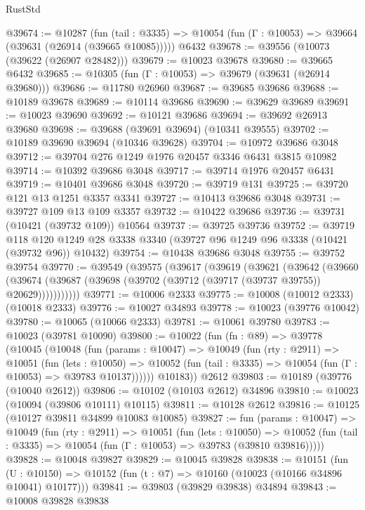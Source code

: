 \begin{lexlean}{RustStd}
\begin{coremodule}
@39674 := @10287
    (fun (tail : @3335) => @10054 (fun (Γ : @10053) => @39664 (@39631 (@26914 (@39665 @10085)))))
    @6432
@39678 := @39556 (@10073 (@39622 (@26907 @28482)))
@39679 := @10023 @39678
@39680 := @39665 @6432
@39685 := @10305 (fun (Γ : @10053) => @39679 (@39631 (@26914 @39680)))
@39686 := @11780 @26960
@39687 := @39685 @39686
@39688 := @10189 @39678
@39689 := @10114 @39686
@39690 := @39629 @39689
@39691 := @10023 @39690
@39692 := @10121 @39686
@39694 := @39692 @26913 @39680
@39698 := @39688 (@39691 @39694) (@10341 @39555)
@39702 := @10189 @39690 @39694 (@10346 @39628)
@39704 := @10972 @39686 @3048
@39712 := @39704 @276 @1249 @1976 @20457 @3346 @6431 @3815 @10982
@39714 := @10392 @39686 @3048
@39717 := @39714 @1976 @20457 @6431
@39719 := @10401 @39686 @3048
@39720 := @39719 @131
@39725 := @39720 @121 @13 @1251 @3357 @3341
@39727 := @10413 @39686 @3048
@39731 := @39727 @109 @13 @109 @3357
@39732 := @10422 @39686
@39736 := @39731 (@10421 (@39732 @109)) @10564
@39737 := @39725 @39736
@39752 := @39719
    @118
    @120
    @1249
    @28
    @3338
    @3340
    (@39727 @96 @1249 @96 @3338 (@10421 (@39732 @96)) @10432)
@39754 := @10438 @39686 @3048
@39755 := @39752 @39754
@39770 := @39549
    (@39575
      (@39617
        (@39619
          (@39621
            (@39642
              (@39660
                (@39674 (@39687 (@39698 (@39702 (@39712 (@39717 (@39737 @39755)) @20629)))))))))))
@39771 := @10006 @2333
@39775 := @10008 (@10012 @2333) (@10018 @2333)
@39776 := @10027 @34893
@39778 := @10023 (@39776 @10042)
@39780 := @10065 (@10066 @2333)
@39781 := @10061 @39780
@39783 := @10023 (@39781 @10090)
@39800 := @10022
    (fun (fn : @89) =>
    @39778
      (@10045
        (@10048
          (fun (params : @10047) =>
          @10049
            (fun (rty : @2911) =>
            @10051
              (fun (lets : @10050) =>
              @10052 (fun (tail : @3335) => @10054 (fun (Γ : @10053) => @39783 @10137))))))
        @10183))
    @2612
@39803 := @10189 (@39776 (@10040 @2612))
@39806 := @10102 (@10103 @2612) @34896
@39810 := @10023 (@10094 (@39806 @10111) @10115)
@39811 := @10128 @2612
@39816 := @10125 (@10127 @39811 @34899 @10083 @10085)
@39827 := fun (params : @10047) =>
  @10049
    (fun (rty : @2911) =>
    @10051
      (fun (lets : @10050) =>
      @10052 (fun (tail : @3335) => @10054 (fun (Γ : @10053) => @39783 (@39810 @39816)))))
@39828 := @10048 @39827
@39829 := @10045 @39828
@39838 := @10151
    (fun (U : @10150) => @10152 (fun (t : @7) => @10160 (@10023 (@10166 @34896 @10041) @10177)))
@39841 := @39803 (@39829 @39838) @34894
@39843 := @10008 @39828 @39838

\end{coremodule}
\end{lexlean}
